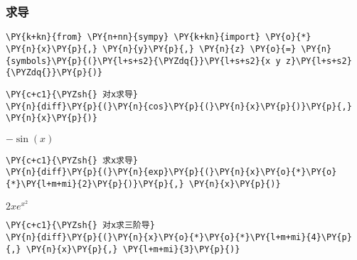     \hypertarget{ux6c42ux5bfc}{%
\subsubsection{求导}\label{ux6c42ux5bfc}}

    \begin{tcolorbox}[breakable, size=fbox, boxrule=1pt, pad at break*=1mm,colback=cellbackground, colframe=cellborder]
\begin{Verbatim}[commandchars=\\\{\}]
\PY{k+kn}{from} \PY{n+nn}{sympy} \PY{k+kn}{import} \PY{o}{*}
\PY{n}{x}\PY{p}{,} \PY{n}{y}\PY{p}{,} \PY{n}{z} \PY{o}{=} \PY{n}{symbols}\PY{p}{(}\PY{l+s+s2}{\PYZdq{}}\PY{l+s+s2}{x y z}\PY{l+s+s2}{\PYZdq{}}\PY{p}{)}
\end{Verbatim}
\end{tcolorbox}

    \begin{tcolorbox}[breakable, size=fbox, boxrule=1pt, pad at break*=1mm,colback=cellbackground, colframe=cellborder]
\begin{Verbatim}[commandchars=\\\{\}]
\PY{c+c1}{\PYZsh{} 对x求导}
\PY{n}{diff}\PY{p}{(}\PY{n}{cos}\PY{p}{(}\PY{n}{x}\PY{p}{)}\PY{p}{,} \PY{n}{x}\PY{p}{)}
\end{Verbatim}
\end{tcolorbox}
 
            
    
    $\displaystyle - \sin{\left(x \right)}$

    

    \begin{tcolorbox}[breakable, size=fbox, boxrule=1pt, pad at break*=1mm,colback=cellbackground, colframe=cellborder]
\begin{Verbatim}[commandchars=\\\{\}]
\PY{c+c1}{\PYZsh{} 求x求导}
\PY{n}{diff}\PY{p}{(}\PY{n}{exp}\PY{p}{(}\PY{n}{x}\PY{o}{*}\PY{o}{*}\PY{l+m+mi}{2}\PY{p}{)}\PY{p}{,} \PY{n}{x}\PY{p}{)}
\end{Verbatim}
\end{tcolorbox}
 
            
    
    $\displaystyle 2 x e^{x^{2}}$

    

    \begin{tcolorbox}[breakable, size=fbox, boxrule=1pt, pad at break*=1mm,colback=cellbackground, colframe=cellborder]
\begin{Verbatim}[commandchars=\\\{\}]
\PY{c+c1}{\PYZsh{} 对x求三阶导}
\PY{n}{diff}\PY{p}{(}\PY{n}{x}\PY{o}{*}\PY{o}{*}\PY{l+m+mi}{4}\PY{p}{,} \PY{n}{x}\PY{p}{,} \PY{l+m+mi}{3}\PY{p}{)}
\end{Verbatim}
\end{tcolorbox}
 
